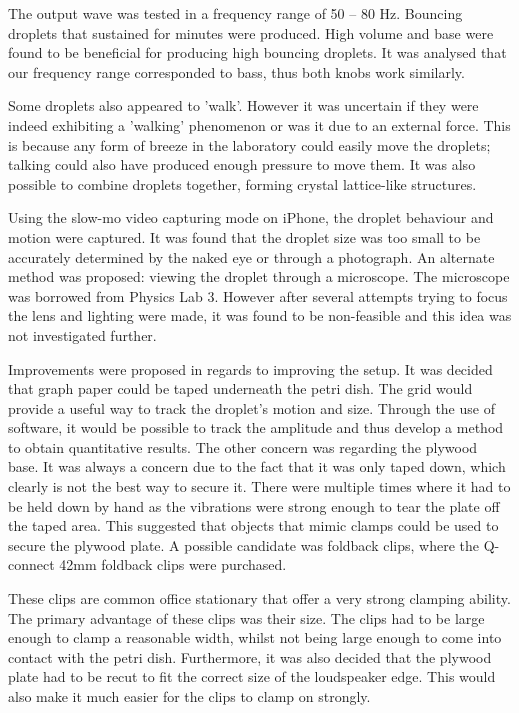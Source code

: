 The output wave was tested in a frequency range of 50 -- 80 Hz. Bouncing droplets that sustained for minutes were produced. High volume and base were found to be beneficial for producing high bouncing droplets. It was analysed that our frequency range corresponded to bass, thus both knobs work similarly.

Some droplets also appeared to 'walk'. However it was uncertain if they were indeed exhibiting a 'walking' phenomenon or was it due to an external force. This is because any form of breeze in the laboratory could easily move the droplets; talking could also have produced enough pressure to move them. It was also possible to combine droplets together, forming crystal lattice-like structures.

Using the slow-mo video capturing mode on iPhone, the droplet behaviour and motion were captured. It was found that the droplet size was too small to be accurately determined by the naked eye or through a photograph. An alternate method was proposed: viewing the droplet through a microscope. The microscope was borrowed from Physics Lab 3. However after several attempts trying to focus the lens and lighting were made, it was found to be non-feasible and this idea was not investigated further.

Improvements were proposed in regards to improving the setup. It was decided that graph paper could be taped underneath the petri dish. The grid would provide a useful way to track the droplet's motion and size. Through the use of software, it would be possible to track the amplitude and thus develop a method to obtain quantitative results. The other concern was regarding the plywood base. It was always a concern due to the fact that it was only taped down, which clearly is not the best way to secure it. There were multiple times where it had to be held down by  hand as the vibrations were strong enough to tear the plate off the taped area. This suggested that objects that mimic clamps could be used to secure the plywood plate. A possible candidate was foldback clips, where the Q-connect 42mm  foldback clips were purchased.


These clips are common office stationary that offer a very strong clamping ability. The primary advantage of these clips was their size. The clips had to be large enough to clamp a reasonable width, whilst not being large enough to come into contact with the petri dish. Furthermore, it was also decided that the plywood plate had to be recut to fit the correct size of the loudspeaker edge. This would also make it much easier for the clips to clamp on strongly.

